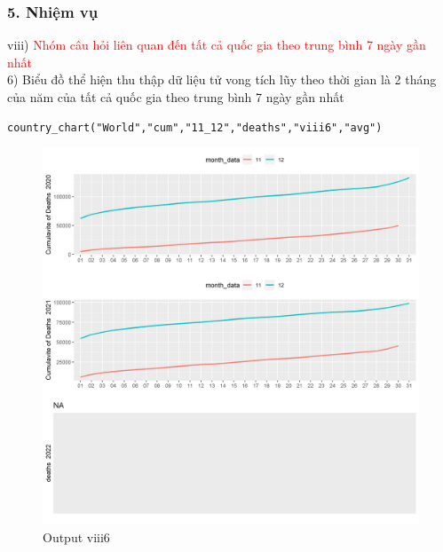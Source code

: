 \documentclass[english,10pt,table]{beamer}
\begin{document}
\begin{frame}[fragile]
\frametitle{5.  Nhiệm vụ}
viii) \textcolor{red}{Nhóm câu hỏi liên quan đến tất cả quốc gia theo trung bình 7 ngày gần nhất}\\
  6) Biểu đồ thể hiện thu thập dữ liệu tử vong tích lũy theo thời gian là 2 tháng của năm của tất cả quốc gia theo trung bình 7 ngày gần nhất
  \begin{lstlisting}[frame = single,basicstyle=\tiny]
country_chart("World","cum","11_12","deaths","viii6","avg")      
    \end{lstlisting}
			\begin{figure}[h!]
	\begin{center}
		    \includegraphics[scale = 0.21]{Images/VIII/viii6 World .jpeg}
		     \caption{Output viii6}
		\end{center}
		\end{figure}
\end{frame}
\end{document}
